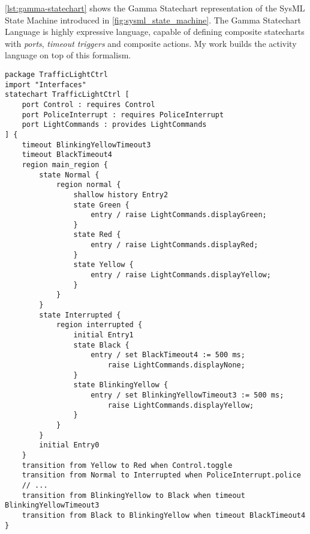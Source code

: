 \autoref{lst:gamma-statechart} shows the Gamma Statechart representation of the SysML State Machine introduced in \autoref{fig:sysml_state_machine}. The Gamma Statechart Language is highly expressive language, capable of defining composite statecharts with \emph{ports}, \emph{timeout triggers} and composite actions. My work builds the activity language on top of this formalism. 

\begin{lstlisting}[float,language=statechart, caption={The traffic light controller state machine in the textual representation of the Gamma Statechart Language.}, label={lst:gamma-statechart}]
package TrafficLightCtrl
import "Interfaces"
statechart TrafficLightCtrl [
	port Control : requires Control
	port PoliceInterrupt : requires PoliceInterrupt
	port LightCommands : provides LightCommands
] {
	timeout BlinkingYellowTimeout3
	timeout BlackTimeout4
	region main_region {
		state Normal {
			region normal {
				shallow history Entry2
				state Green {
					entry / raise LightCommands.displayGreen;
				}
				state Red {
					entry / raise LightCommands.displayRed;
				}
				state Yellow {
					entry / raise LightCommands.displayYellow;
				}
			}
		}
		state Interrupted {
			region interrupted {
				initial Entry1
				state Black {
					entry / set BlackTimeout4 := 500 ms; 
						raise LightCommands.displayNone;
				}
				state BlinkingYellow {
					entry / set BlinkingYellowTimeout3 := 500 ms; 
						raise LightCommands.displayYellow;
				}
			}
		}
		initial Entry0
	}
	transition from Yellow to Red when Control.toggle
	transition from Normal to Interrupted when PoliceInterrupt.police
	// ...
	transition from BlinkingYellow to Black when timeout BlinkingYellowTimeout3
	transition from Black to BlinkingYellow when timeout BlackTimeout4
}
\end{lstlisting}